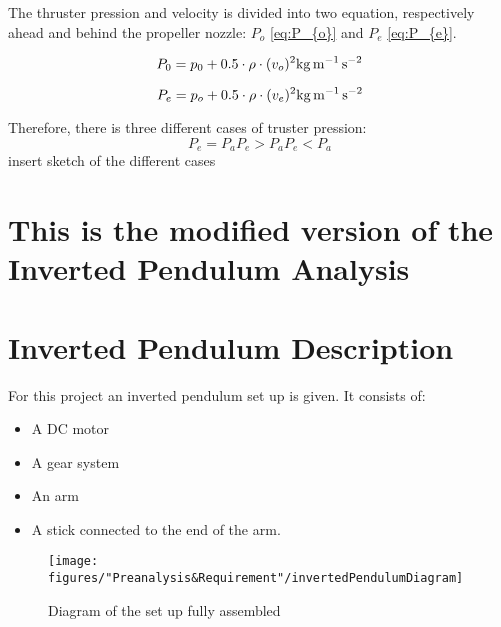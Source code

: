 The thruster pression and velocity is divided into two equation, respectively ahead and behind the propeller nozzle: $P_{o}$ \eqref{eq:P_{o}} and $P_{e}$ \eqref{eq:P_{e}}.

\begin{equation}
P_{0} = p_{0} + 0.5 \cdot \rho \cdot(v_{o})^2 \si{\kilo\gram\per\meter\per\second\squared} \label{eq:P_{o}}
\end{equation}
\startexplain
{}
\stopexplain

\begin{equation}
P_{e} = p_{o} + 0.5 \cdot \rho \cdot(v_{e})^2 \si{\kilo\gram\per\meter\per\second\squared} \label{eq:P_{e}}
\end{equation}
\startexplain
{}
\stopexplain

Therefore, there is three different cases of truster pression:
\begin{equation}
P_{e} = P_{a}
P_{e} > P_{a}
P_{e} < P_{a}
\end{equation}
 insert sketch of the different cases
 
 
 
 
 
 
 

		\section{This is the modified version of the Inverted Pendulum Analysis}
		
		
		
		
\section{Inverted Pendulum Description}
For this project an inverted pendulum set up is given. It consists of:
\begin{itemize}
	\item A DC motor
	\item A gear system
	\item An arm
	\item A stick connected to the end of the arm.
\end{itemize}

\begin{figure} [htbp]
	\centering
	\texttt{[image: figures/"Preanalysis\&Requirement"/invertedPendulumDiagram]}
	\caption{Diagram of the set up fully assembled} \label{fig:InvertedPendulumSetUp}
\end{figure}

